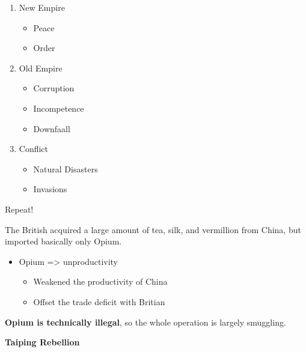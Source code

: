 \documentclass[letterpaper]{article}
\begin{document}
\begin{enumerate}
\item New Empire

\begin{itemize}
\item Peace
\item Order
\end{itemize}

\item Old Empire

\begin{itemize}
\item Corruption
\item Incompetence
\item Downfaall
\end{itemize}

\item Conflict

\begin{itemize}
\item Natural Disasters
\item Invasions
\end{itemize}
\end{enumerate}

Repeat!

The British acquired a large amount of tea, silk, and vermillion from
China, but imported basically only Opium.

\begin{itemize}
\item Opium => unproductivity

\begin{itemize}
\item Weakened the productivity of China
\item Offset the trade deficit with Britian
\end{itemize}
\end{itemize}

\textbf{Opium is technically illegal}, so the whole operation is largely
smuggling.

\textbf{Taiping Rebellion}
\end{document}
